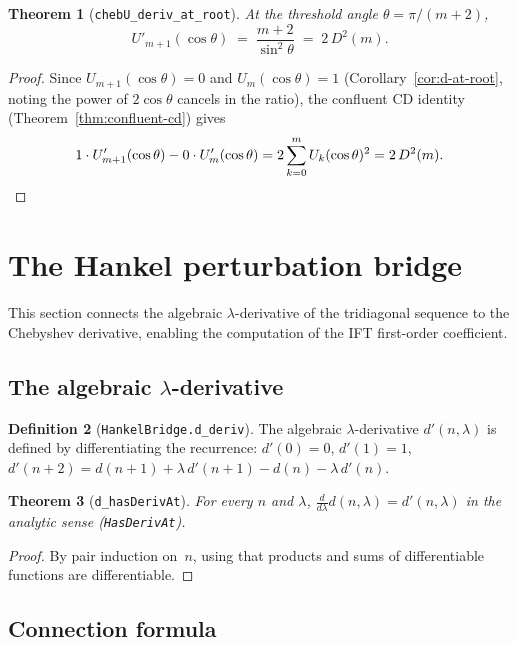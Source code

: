 \documentclass[11pt,a4paper]{article}
\theoremstyle{plain}
\newtheorem{theorem}{Theorem}[section]
\theoremstyle{definition}
\newtheorem{definition}[theorem]{Definition}
\newcommand{\Dsq}{D^2}
\newcommand{\chebU}{U}
\newcommand{\lean}[1]{\texttt{#1}}
\begin{document}
\begin{theorem}[\lean{chebU\_deriv\_at\_root}]
\label{thm:deriv-at-root}
At the threshold angle $\theta = \pi/(m{+}2)$,
\[
  \chebU'_{m+1}(\cos\theta) \;=\; \frac{m+2}{\sin^2\theta} \;=\; 2\,\Dsq(m).
\]
\end{theorem}

\begin{proof}
Since $\chebU_{m+1}(\cos\theta) = 0$ and $\chebU_m(\cos\theta) = 1$
(Corollary~\ref{cor:d-at-root}, noting the power of $2\cos\theta$
cancels in the ratio), the confluent CD identity
(Theorem~\ref{thm:confluent-cd}) gives
\[
  1 \cdot \chebU'_{m+1}(\cos\theta) - 0 \cdot \chebU'_m(\cos\theta)
  = 2\sum_{k=0}^m \chebU_k(\cos\theta)^2 = 2\,\Dsq(m). \qedhere
\]
\end{proof}

\section{The Hankel perturbation bridge}
\label{sec:hankel}

This section connects the algebraic $\lambda$-derivative of the
tridiagonal sequence to the Chebyshev derivative, enabling the
computation of the IFT first-order coefficient.

\subsection{The algebraic $\lambda$-derivative}

\begin{definition}[\lean{HankelBridge.d\_deriv}]
The algebraic $\lambda$-derivative $d'(n,\lambda)$ is defined by
differentiating the recurrence:
$d'(0)=0$, $d'(1)=1$,
$d'(n{+}2) = d(n{+}1) + \lambda\,d'(n{+}1) - d(n) - \lambda\,d'(n)$.
\end{definition}

\begin{theorem}[\lean{d\_hasDerivAt}]
\label{thm:hasDerivAt}
For every $n$ and $\lambda$, $\frac{d}{d\lambda} d(n,\lambda) = d'(n,\lambda)$
in the analytic sense (\lean{HasDerivAt}).
\end{theorem}

\begin{proof}
By pair induction on~$n$, using that products and sums
of differentiable functions are differentiable.
\end{proof}

\subsection{Connection formula}
\end{document}
